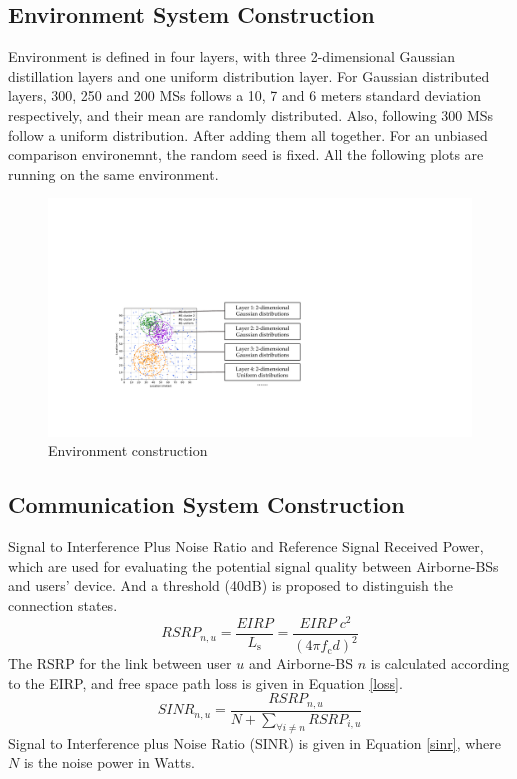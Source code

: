\documentclass[
12pt, %
a4paper, %
oneside, %
headinclude,footinclude, %
BCOR5mm, %
]{scrartcl}
\begin{document}
\subsection{Environment System Construction}
\noindent Environment is defined in four layers, with three 2-dimensional Gaussian distillation layers and one uniform distribution layer. For Gaussian distributed layers, 300, 250 and 200 MSs follows a 10, 7 and 6 meters standard deviation respectively, and their mean are randomly distributed. Also, following 300 MSs follow a uniform distribution. After adding them all together. For an unbiased comparison environemnt, the random seed is fixed. All the following plots are running on the same environment.\\
\begin{figure}[h]%
	\centering  %
	\includegraphics[width=0.8\linewidth]{figures/env_cons}  %
	\caption{Environment construction}  %
	\label{fig:env_cons}   %
\end{figure}




\subsection{Communication System Construction}
Signal to Interference Plus Noise Ratio and Reference Signal Received Power, which are used for evaluating the potential signal quality between Airborne-BSs and users' device. And a threshold (40dB) is proposed to distinguish the connection states.\\
\begin{equation}
R S R P_{n, u}= \frac{EIRP}{L_{\mathrm{s}}}= \frac{EIRP\; c^{2}}{\left(4\pi  f_{\mathrm{c}} d\right)^{2}}
\label{rsrp}
\end{equation}
\noindent The RSRP for the link between user $u$ and Airborne-BS $n$ is calculated according to the EIRP, and free space path loss is given in Equation \ref{loss}.
\begin{equation}
S I N R_{n, u}=\frac{R S R P_{n, u}}{N+\sum_{\forall i \neq n} R S R P_{i, u}}
\label{sinr}
\end{equation}
\noindent Signal to Interference plus Noise Ratio (SINR) is given in Equation \ref{sinr}, where $N$ is the noise power in Watts.
\end{document}
